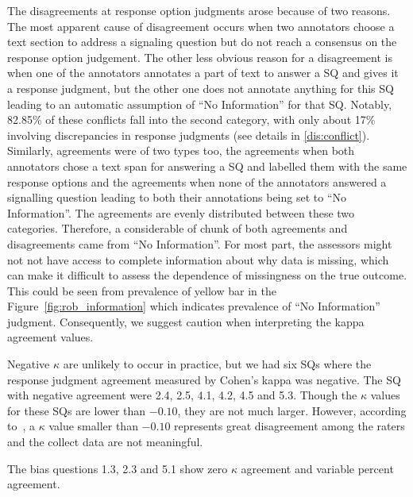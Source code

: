 \documentclass[sn-mathphys,Numbered]{sn-jnl}%
\theoremstyle{thmstyleone}%
\theoremstyle{thmstyletwo}%
\theoremstyle{thmstylethree}%
\begin{document}
The disagreements at response option judgments arose because of two reasons.
The most apparent cause of disagreement occurs when two annotators choose a text section to address a signaling question but do not reach a consensus on the response option judgement.
The other less obvious reason for a disagreement is when one of the annotators annotates a part of text to answer a SQ and gives it a response judgment, but the other one does not annotate anything for this SQ leading to an automatic assumption of ``No Information'' for that SQ.
Notably, 82.85\% of these conflicts fall into the second category, with only about 17\% involving discrepancies in response judgments (see details in \ref{dis:conflict}).
Similarly, agreements were of two types too, the agreements when both annotators chose a text span for answering a SQ and labelled them with the same response options and the agreements when none of the annotators answered a signalling question leading to both their annotations being set to ``No Information''.
The agreements are evenly distributed between these two categories.
Therefore, a considerable of chunk of both agreements and disagreements came from ``No Information''.
For most part, the assessors might not not have access to complete information about why data is missing, which can make it difficult to assess the dependence of missingness on the true outcome.
This could be seen from prevalence of yellow bar in the Figure~\ref{fig:rob_information} which indicates prevalence of ``No Information'' judgment.
Consequently, we suggest caution when interpreting the kappa agreement values.


Negative $\kappa$ are unlikely to occur in practice, but we had six SQs where the response judgment agreement measured by Cohen's kappa was negative.
The SQ with negative agreement were 2.4, 2.5, 4.1, 4.2, 4.5 and 5.3.
Though the $\kappa$ values for these SQs are lower than $-0.10$, they are not much larger.
However, according to~\cite{mchugh2012interrater}, a $\kappa$ value smaller than $-0.10$ represents great disagreement among the raters and the collect data are not meaningful.

The bias questions 1.3, 2.3 and 5.1 show zero $\kappa$ agreement and variable percent agreement.
\end{document}
